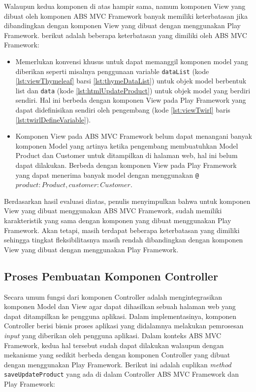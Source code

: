 Walaupun kedua komponen di atas hampir sama, namum komponen View yang dibuat oleh komponen ABS MVC Framework banyak memiliki keterbatasan jika dibandingkan dengan komponen View yang dibuat dengan menggunakan Play Framework. berikut adalah beberapa keterbatasan yang dimiliki oleh ABS MVC Framework:

\begin{itemize}
    \item Memerlukan konvensi khusus untuk dapat memanggil komponen model yang diberikan seperti misalnya penggunaan variable \texttt{dataList} (kode \ref{lst:viewThymeleaf} barsi \ref{lst:thymeDataList}) untuk objek model berbentuk list dan \texttt{data} (kode \ref{lst:htmlUpdateProduct}) untuk objek model yang berdiri sendiri. Hal ini berbeda dengan komponen View pada Play Framework yang dapat didefinisikan sendiri oleh pengembang (kode \ref{lst:viewTwirl} baris \ref{lst:twirlDefineVariable}).
    \item Komponen View pada ABS MVC Framework belum dapat menangani banyak komponen Model yang artinya ketika pengembang membuatuhkan Model Product dan Customer untuk ditampilkan di halaman web,  hal ini belum dapat dilakukan. Berbeda dengan komponen View pada Play Framework yang dapat menerima banyak model dengan menggunakan \texttt{@\(product: Product, customer: Customer\)}.
\end{itemize}

Berdasarkan hasil evaluasi diatas, penulis menyimpulkan bahwa untuk komponen View yang dibuat menggunakan ABS MVC Framework, sudah memiliki karakteristik yang sama dengan komponen yang dibuat menggunakan Play Framework. Akan tetapi, masih terdapat beberapa keterbatasan yang dimiliki sehingga tingkat fleksibilitasnya masih rendah dibandingkan dengan komponen View yang dibuat dengan menggunakan Play Framework.

\subsection{Proses Pembuatan Komponen Controller}

Secara umum fungsi dari komponen Controller adalah mengintegrasikan komponen Model dan View agar dapat dihasilkan sebuah halaman web yang dapat ditampilkan ke pengguna aplikasi. Dalam implementasinya, komponen Controller berisi bisnis proses aplikasi yang didalamnya melakukan pemrosesan \textit{input} yang diberikan oleh pengguna aplikasi. Dalam konteks ABS MVC Framework, kedua hal tersebut sudah dapat dilakukan walaupun dengan mekanisme yang sedikit berbeda dengan komponen Controller yang dibuat dengan menggunakan Play Framework. Berikut ini adalah cuplikan \textit{method} \texttt{saveUpdateProduct} yang ada di dalam Controller ABS MVC Framework dan Play Framework:


